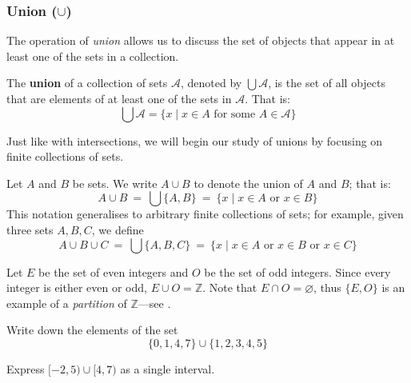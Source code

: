 \subsubsection*{Union ($\cup$)}

The operation of \textit{union} allows us to discuss the set of objects that appear in at least one of the sets in a collection.

\begin{definition}[Union]
\label{defUnion}
The \textbf{union} of a collection of sets $\mathcal{A}$, denoted by $\bigcup \mathcal{A}$, is the set of all objects that are elements of at least one of the sets in $\mathcal{A}$. That is:
\[ \bigcup \mathcal{A} = \{ x \mid x \in A \text{ for some } A \in \mathcal{A} \} \]
\end{definition}


Just like with intersections, we will begin our study of unions by focusing on finite collections of sets.

\begin{notation}
\label{ntnUnionPairwise}
Let $A$ and $B$ be sets. We write $A \cup B$ to denote the union of $A$ and $B$; that is:
\[ A \cup B ~=~ \bigcup \{ A, B \} ~=~ \{ x \mid x \in A \text{ or } x \in B \} \]
This notation generalises to arbitrary finite collections of sets; for example, given three sets $A,B,C$, we define
\[ A \cup B \cup C ~=~ \bigcup \{ A, B, C \} ~=~ \{ x \mid x \in A \text{ or } x \in B \text{ or } x \in C \} \]
\end{notation}


\begin{example}
Let $E$ be the set of even integers and $O$ be the set of odd integers. Since every integer is either even or odd, $E \cup O = \mathbb{Z}$. Note that $E \cap O = \varnothing$, thus $\{E,O\}$ is an example of a \textit{partition} of $\mathbb{Z}$---see .
\end{example}

\begin{exercise}
Write down the elements of the set
\[ \{ 0, 1, 4, 7 \} \cup \{ 1, 2, 3, 4, 5 \} \]
\end{exercise}

\begin{exercise}
Express $[-2,5) \cup [4,7)$ as a single interval.
\end{exercise}

